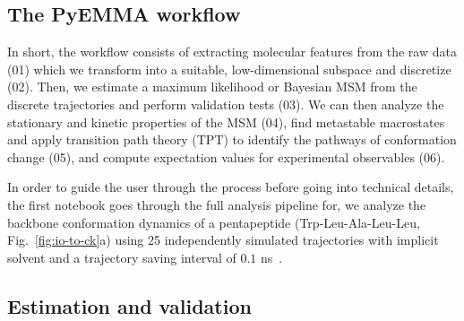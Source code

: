 \documentclass[9pt,tutorial]{livecoms}
\begin{document}
\subsection{The PyEMMA workflow}

In short, the workflow consists of extracting molecular features from the raw data (01) which we transform into a suitable, low-dimensional subspace and discretize (02).
Then, we estimate a maximum likelihood or Bayesian MSM from the discrete trajectories and perform validation tests (03).
We can then analyze the stationary and kinetic properties of the MSM (04),
find metastable macrostates and apply transition path theory (TPT) to identify the pathways of conformation change (05),
and compute expectation values for experimental observables (06).

In order to guide the user through the process before going into technical details,
the first notebook goes through the full analysis pipeline for,
we analyze the backbone conformation dynamics of a pentapeptide (Trp-Leu-Ala-Leu-Leu, Fig.~\ref{fig:io-to-ck}a) using 25 independently simulated trajectories with implicit solvent and a trajectory saving interval of $0.1$ ns~\cite{pyemma}.

\subsection{Estimation and validation}
\end{document}
